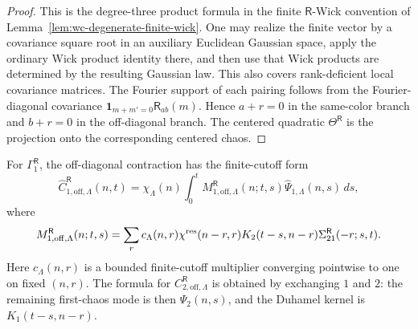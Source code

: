 \documentclass[10pt]{amsart}
\numberwithin{equation}{section}
\theoremstyle{plain}
\theoremstyle{definition}
\theoremstyle{remark}
\begin{document}
\begin{proof}
This is the degree-three product formula in the finite \(\mathsf R\)-Wick convention of Lemma~\ref{lem:wc-degenerate-finite-wick}.  One may realize the finite vector by a covariance square root in an auxiliary Euclidean Gaussian space, apply the ordinary Wick product identity there, and then use that Wick products are determined by the resulting Gaussian law.  This also covers rank-deficient local covariance matrices.  The Fourier support of each pairing follows from the Fourier-diagonal covariance \(\mathbf 1_{m+m'=0}\mathsf R_{ab}(m)\).  Hence \(a+r=0\) in the same-color branch and \(b+r=0\) in the off-diagonal branch.  The centered quadratic \(\Theta^{\mathsf R}\) is the projection onto the corresponding centered chaos.
\end{proof}

For \(\Gamma_1^{\mathsf R}\), the off-diagonal contraction has the finite-cutoff form
\begin{equation}\label{eq:wc-cubic-offdiag-formula}
\widehat C_{1,\mathrm{off},\Lambda}^{\mathsf R}(n,t)
=\chi_\Lambda(n)\int_0^t M_{1,\mathrm{off},\Lambda}^{\mathsf R}(n;t,s)
        \widehat\Psi_{1,\Lambda}(n,s)\,ds,
\end{equation}
where
\begin{equation}\label{eq:wc-cubic-offdiag-multiplier}
M_{1,\mathrm{off},\Lambda}^{\mathsf R}(n;t,s)
=\sum_r c_\Lambda(n,r)\chi^{\rm res}(n-r,r)
        K_2(t-s,n-r)\Sigma_{21}^{\mathsf R}(-r;s,t).
\end{equation}
Here \(c_\Lambda(n,r)\) is a bounded finite-cutoff multiplier converging pointwise to one on fixed \((n,r)\).  The formula for \(C_{2,\mathrm{off},\Lambda}^{\mathsf R}\) is obtained by exchanging \(1\) and \(2\): the remaining first-chaos mode is then \(\Psi_2(n,s)\), and the Duhamel kernel is \(K_1(t-s,n-r)\).
\end{document}
